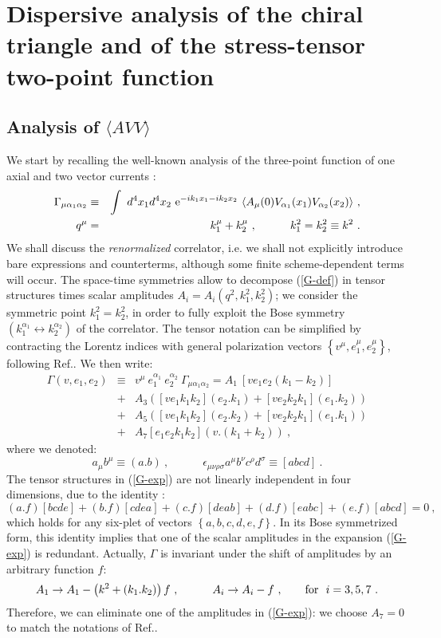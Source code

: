 \documentclass[11pt]{article}
\newcommand{\beq}{\begin{equation}}
\newcommand{\eeq}{\end{equation}}
\newcommand{\bea}{\begin{eqnarray}}
\newcommand{\eea}{\end{eqnarray}}
\def\s{\sigma}
\def\a{\alpha}
\def\eps{\epsilon}
\def\G{\Gamma}
\def\ex{{\rm e}}
\def\nl{\nonumber\\}
\def\bra{\langle}
\def\ket{\rangle}
\begin{document}
 
 
 
\section{Dispersive analysis of the chiral triangle 
and of the stress-tensor two-point function} 
 
 
 
 
\subsection{Analysis of $\bra AVV \ket$} 
 
We start by recalling the well-known analysis 
of the three-point function of one axial and two vector currents \cite{fsby}: 
\bea\label{G-def} 
\G_{\mu\a_1\a_2} &\equiv & \int \ d^4x_1 d^4 x_2 \  
\ex^{-ik_1 x_1 -i k_2 x_2} \  
\bra A_\mu (0) V_{\a_1} (x_1) V_{\a_2} (x_2) \ket\ ,\nl 
q^\mu &=& k_1^\mu +k_2^\mu\ , \qquad\quad  
k_1^2=k_2^2\equiv k^2 \ . 
\eea 
We shall discuss the {\it renormalized} correlator,
i.e. we shall not explicitly introduce bare expressions and counterterms,
although some finite scheme-dependent terms will occur.
The space-time symmetries allow to decompose (\ref{G-def}) 
in tensor structures times scalar amplitudes 
$A_i=A_i(q^2,k_1^2,k_2^2)$; we consider the symmetric point 
$k_1^2=k_2^2$, in order to fully exploit the Bose symmetry  
$\left( k_1^{\a_1} \leftrightarrow k_2^{\a_2} \right)$ of the correlator.
The tensor notation can be simplified  
by contracting the Lorentz indices with general polarization 
vectors $\left\{v^\mu, e_1^\mu,e_2^\mu \right\}$, following 
Ref.\cite{rose}. We then write: 
\bea\label{G-exp} 
\G\left(v,e_1,e_2\right) &\equiv&  
v^\mu\ e_1^{\a_1}\ e_2^{\a_2}\ \G_{\mu\a_1\a_2} =  
  A_1 \ \left[ v e_1 e_2 (k_1-k_2) \right]  \nl 
& +& A_3 \left( \left[ v e_1 k_1 k_2 \right] (e_2.k_1) +  
                \left[ v e_2 k_2 k_1 \right] (e_1.k_2) \right) \nl  
& +& A_5 \left( \left[ v e_1 k_1 k_2 \right] (e_2.k_2) +  
                \left[ v e_2 k_2 k_1 \right] (e_1.k_1) \right) \nl 
& +& A_7 \left[e_1 e_2 k_1 k_2 \right] \left( v.(k_1+k_2) \right)\ , 
\eea  
where we denoted: 
\beq 
a_\mu b^\mu \equiv (a.b) \ ,\qquad\quad 
\eps_{\mu\nu\rho\s} a^\mu b^\nu c^\rho d^\s \equiv  
\left[ abcd \right] \ . 
\eeq 
The tensor structures in (\ref{G-exp}) are not linearly independent  
in four dimensions, due to the identity \cite{rose}: 
\beq\label{rose-ide} 
(a.f)\left[bcde\right] + (b.f)\left[cdea\right] +  
(c.f)\left[deab\right] + (d.f)\left[eabc\right] +  
(e.f)\left[abcd\right] =0\ , 
\eeq 
which holds for any six-plet of vectors $\left\{a,b,c,d,e,f\right\}$. 
In its Bose symmetrized form, this identity implies  
that one of the scalar amplitudes in the expansion (\ref{G-exp}) 
is redundant. Actually, $\G$ is invariant under 
the shift of amplitudes by an arbitrary function $f$: 
\beq\label{shift} 
A_1 \to A_1 - \left( k^2 +(k_1.k_2) \right)f \ ,\qquad\quad 
A_i \to A_i - f \ ,\qquad {\rm for}\ \ i=3,5,7\ . 
\eeq 
Therefore, we can eliminate one of the amplitudes in (\ref{G-exp}): 
we choose $A_7=0$ to match the notations of Ref.\cite{fsby}. 
 
\end{document}
